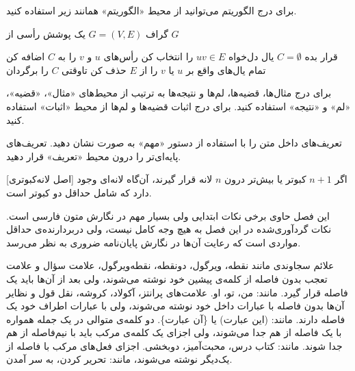



برای درج الگوریتم می‌توانید از محیط «الگوریتم» همانند زیر استفاده کنید.

 گراف $G=(V, E)$
 یک پوشش رأسی از $G$

 قرار بده $C = \emptyset$  %
 یال دل‌‌خواه $uv \in E$ را انتخاب کن
 رأس‌های $u$ و $v$ را به $C$ اضافه کن
 تمام یال‌های واقع بر $u$ یا $v$ را از $E$ حذف کن
‌تاوقتی
 $C$ را برگردان



برای درج مثال‌ها، قضیه‌ها، لم‌ها و نتیجه‌ها به ترتیب از محیط‌های
«مثال»، «قضیه»، «لم» و «نتیجه» استفاده کنید.
برای درج اثبات قضیه‌ها و لم‌ها  از محیط «اثبات» استفاده کنید.

تعریف‌های داخل متن را با استفاده از دستور «مهم» به صورت  نشان دهید.
تعریف‌های پایه‌ای‌تر را درون محیط «تعریف» قرار دهید.

[اصل لانه‌کبوتری]
اگر $n+1$ کبوتر یا بیش‌تر درون  $n$ لانه قرار گیرند، آن‌گاه لانه‌ای 
وجود دارد که شامل حداقل دو کبوتر است.





این فصل حاوی برخی نکات ابتدایی ولی بسیار مهم در نگارش متون فارسی است. 
نکات گردآوری‌شده در این فصل به‌ هیچ‌ وجه کامل نیست، 
ولی دربردارنده‌ی حداقل مواردی است که رعایت آن‌ها در نگارش پایان‌نامه ضروری به نظر می‌رسد.



علائم سجاوندی مانند نقطه، ویرگول، دونقطه، نقطه‌ویرگول، علامت سؤال و علامت تعجب %
بدون فاصله از کلمه‌ی پیشین خود نوشته می‌شوند، ولی بعد از آن‌ها باید یک فاصله‌ قرار گیرد. مانند: من، تو، او.
علامت‌های پرانتز، آکولاد، کروشه، نقل قول و نظایر آن‌ها بدون فاصله با عبارات داخل خود نوشته می‌شوند، ولی با عبارات اطراف خود یک فاصله دارند. مانند: (این عبارت) یا \{آن عبارت\}.
دو کلمه‌ی متوالی در یک جمله همواره با یک فاصله از هم جدا می‌شوند، ولی اجزای یک کلمه‌ی مرکب باید با نیم‌فاصله‌‌
 از هم جدا شوند. مانند: کتاب درس، محبت‌آمیز، دوبخشی.
 اجزای فعل‌های مرکب با فاصله از یک‌دیگر نوشته می‌شوند، مانند: تحریر کردن، به سر آمدن.


